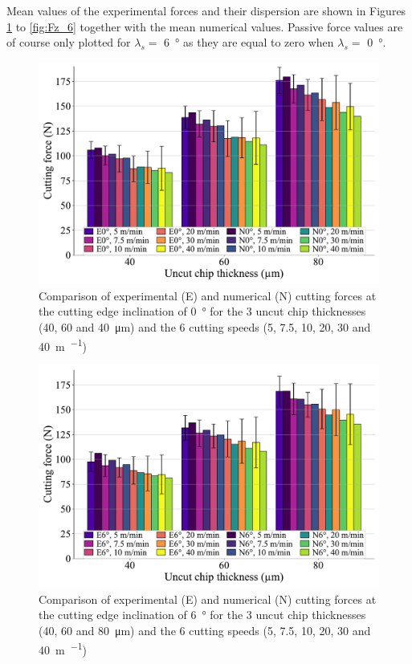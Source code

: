 \documentclass[preprint,12pt,times]{elsarticle}
\begin{document}
Mean values of the experimental forces and their dispersion are shown in Figures \ref{fig:Fx_0} to \ref{fig:Fz_6} together with the mean numerical values. Passive force values are of course only plotted for $\lambda_s =$ \qty{6}{\degree} as they are equal to zero when $\lambda_s =$ \qty{0}{\degree}.

\begin{figure}[!h]
\centering
\includegraphics[width = 140 mm]{Figures/Fx_0}
\caption{Comparison of experimental (E) and numerical (N) cutting forces at the cutting edge inclination of \qty{0}{\degree} for the 3 uncut chip thicknesses (40, 60 and \qty{40}{\um}) and the 6 cutting speeds (5, 7.5, 10, 20, 30 and \qty{40}{\m\per\min})}
\label{fig:Fx_0}
\end{figure}

\begin{figure}[!h]
\centering
\includegraphics[width = 140 mm]{Figures/Fx_6}
\caption{Comparison of experimental (E) and numerical (N) cutting forces at the cutting edge inclination of \qty{6}{\degree} for the 3 uncut chip thicknesses (40, 60 and \qty{80}{\um}) and the 6 cutting speeds (5, 7.5, 10, 20, 30 and \qty{40}{\m\per\min})}
\label{fig:Fx_6}
\end{figure}
\end{document}
